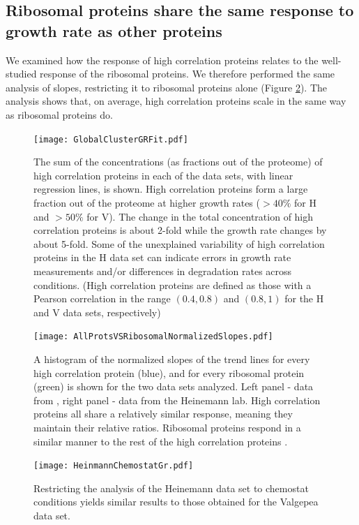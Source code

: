 \documentclass[a4paper,landscape,titlepage,17pt]{extarticle}
\begin{document}
\subsection*{Ribosomal proteins share the same response to growth rate as other proteins}
We examined how the response of high correlation proteins relates to the well-studied response of the ribosomal proteins.
We therefore performed the same analysis of slopes, restricting it to ribosomal proteins alone (Figure \ref{fig:globalfit}).
The analysis shows that, on average, high correlation proteins scale in the same way as ribosomal proteins do.
\clearpage        

\begin{figure}[h]
\centering
\texttt{[image: GlobalClusterGRFit.pdf]}
\caption{\linespread{0.5}\selectfont{}
The sum of the concentrations (as fractions out of the proteome) of high correlation proteins in each of the data sets, with linear regression lines, is shown.
High correlation proteins form a large fraction out of the proteome at higher growth rates ($>40\%$ for H and $>50\%$ for V).
The change in the total concentration of high correlation proteins is about 2-fold while the growth rate changes by about 5-fold.
Some of the unexplained variability of high correlation proteins in the H data set can indicate errors in growth rate measurements and/or differences in degradation rates across conditions.
(High correlation proteins are defined as those with a Pearson correlation in the range $(0.4,0.8)$ and $(0.8,1)$ for the H and V data sets, respectively)
}

\label{fig:globalgrcorr}
\end{figure}
\clearpage        
\begin{figure}[h]
\centering
\texttt{[image: AllProtsVSRibosomalNormalizedSlopes.pdf]}
\caption{\linespread{0.5}\selectfont{}
    A histogram of the normalized slopes of the trend lines for every high correlation protein (blue), and for every ribosomal protein (green) is shown for the two data sets analyzed.
    Left panel - data from \parencite{Valgepea2013}, right panel - data from the Heinemann lab.
    High correlation proteins all share a relatively similar response, meaning they maintain their relative ratios.
    Ribosomal proteins respond in a similar manner to the rest of the high correlation proteins .
}
\label{fig:globalfit}
\end{figure}
\clearpage        

\begin{figure}[h]
\centering
\texttt{[image: HeinmannChemostatGr.pdf]}
\caption{\linespread{0.5}\selectfont{}
  Restricting the analysis of the Heinemann data set to chemostat conditions yields similar results to those obtained for the Valgepea data set.
}
\label{fig:growthcorrchemo}
\end{figure}
\clearpage        
\end{document}
